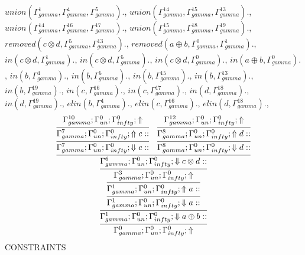 \documentclass[a4paper, 11pt]{article}
\begin{document}
$union(\Gamma_{gamma}^{1}, \Gamma_{gamma}^{4}, \Gamma_{gamma}^{5}).$, $union(\Gamma_{gamma}^{14}, \Gamma_{gamma}^{15}, \Gamma_{gamma}^{13}).$, $union(\Gamma_{gamma}^{14}, \Gamma_{gamma}^{16}, \Gamma_{gamma}^{17}).$, $union(\Gamma_{gamma}^{15}, \Gamma_{gamma}^{18}, \Gamma_{gamma}^{19}).$, $removed(c \otimes d, \Gamma_{gamma}^{5}, \Gamma_{gamma}^{13}).$, $removed(a \oplus b, \Gamma_{gamma}^{0}, \Gamma_{gamma}^{1}).$, $in(c \otimes d, \Gamma_{gamma}^{1}).$, $in(c \otimes d, \Gamma_{gamma}^{5}).$, $in(c \otimes d, \Gamma_{gamma}^{0}).$, $in(a \oplus b, \Gamma_{gamma}^{0}).$, $in(b, \Gamma_{gamma}^{4}).$, $in(b, \Gamma_{gamma}^{5}).$, $in(b, \Gamma_{gamma}^{15}).$, $in(b, \Gamma_{gamma}^{13}).$, $in(b, \Gamma_{gamma}^{19}).$, $in(c, \Gamma_{gamma}^{16}).$, $in(c, \Gamma_{gamma}^{17}).$, $in(d, \Gamma_{gamma}^{18}).$, $in(d, \Gamma_{gamma}^{19}).$, $elin(b, \Gamma_{gamma}^{4}).$, $elin(c, \Gamma_{gamma}^{16}).$, $elin(d, \Gamma_{gamma}^{18}).$, 
{\small
\[
\infer{\Gamma_{ gamma}^{0} ; \Gamma_{un}^{0} ; \Gamma_{ infty}^{0} ;  \Uparrow }
{\infer{\Gamma_{ gamma}^{1} ; \Gamma_{un}^{0} ; \Gamma_{ infty}^{0} ;  \Downarrow a \oplus b :: }
{\infer{\Gamma_{ gamma}^{1} ; \Gamma_{un}^{0} ; \Gamma_{ infty}^{0} ;  \Downarrow a :: }
{\infer{\Gamma_{ gamma}^{1} ; \Gamma_{un}^{0} ; \Gamma_{ infty}^{0} ;  \Uparrow a :: }
{\infer{\Gamma_{ gamma}^{3} ; \Gamma_{un}^{0} ; \Gamma_{ infty}^{0} ;  \Uparrow }
{\infer{\Gamma_{ gamma}^{6} ; \Gamma_{un}^{0} ; \Gamma_{ infty}^{0} ;  \Downarrow c \otimes d :: }
{\infer{\Gamma_{ gamma}^{7} ; \Gamma_{un}^{0} ; \Gamma_{ infty}^{0} ;  \Downarrow c :: }
{\infer{\Gamma_{ gamma}^{7} ; \Gamma_{un}^{0} ; \Gamma_{ infty}^{0} ;  \Uparrow c :: }
{\Gamma_{ gamma}^{10} ; \Gamma_{un}^{0} ; \Gamma_{ infty}^{0} ;  \Uparrow }}
&
\infer{\Gamma_{ gamma}^{8} ; \Gamma_{un}^{0} ; \Gamma_{ infty}^{0} ;  \Downarrow d :: }
{\infer{\Gamma_{ gamma}^{8} ; \Gamma_{un}^{0} ; \Gamma_{ infty}^{0} ;  \Uparrow d :: }
{\Gamma_{ gamma}^{12} ; \Gamma_{un}^{0} ; \Gamma_{ infty}^{0} ;  \Uparrow }}}}}}}}
\]
}
CONSTRAINTS
\end{document}
